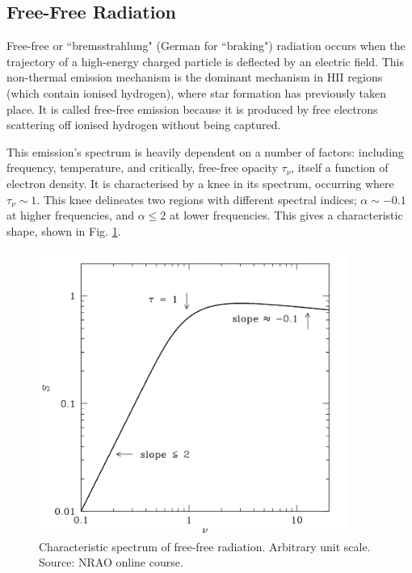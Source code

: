 \subsection{Free-Free Radiation}
\pg
Free-free or ``bremsstrahlung" (German for ``braking") radiation occurs when the trajectory of a high-energy charged particle is deflected by an electric field. This non-thermal emission mechanism is the dominant mechanism in HII regions (which contain ionised hydrogen), where star formation has previously taken place. It is called free-free emission because it is produced by free electrons scattering off ionised hydrogen without being captured. %

\pg
This emission's spectrum is heavily dependent on a number of factors: including frequency, temperature, and critically, free-free opacity $\tau_\nu$, itself a function of electron density. It is characterised by a knee in its spectrum, occurring where $\tau_\nu\sim 1$. This knee delineates two regions with different spectral indices; $\alpha \sim -0.1$ at higher frequencies, and $\alpha \leq 2$ at lower frequencies. This gives a characteristic shape, shown in Fig. \ref{plot.freefree.spectrum}.
\begin{figure}[!h]
\centering
\includegraphics[width=0.9\textwidth]{images/freefree.png}
\caption{\label{plot.freefree.spectrum} Characteristic spectrum of free-free radiation. Arbitrary unit scale. Source: NRAO online course.}
\end{figure}

